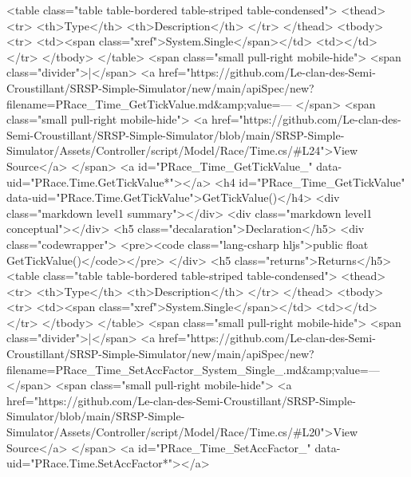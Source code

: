  <table class="table table-bordered table-striped table-condensed">
    <thead>
      <tr>
        <th>Type</th>
        <th>Description</th>
      </tr>
    </thead>
    <tbody>
      <tr>
        <td><span class="xref">System.Single</span></td>
        <td></td>
      </tr>
    </tbody>
  </table>
  <span class="small pull-right mobile-hide">
    <span class="divider">|</span>
    <a href="https://github.com/Le-clan-des-Semi-Croustillant/SRSP-Simple-Simulator/new/main/apiSpec/new?filename=PRace_Time_GetTickValue.md&amp;value=---%
  </span>
  <span class="small pull-right mobile-hide">
    <a href="https://github.com/Le-clan-des-Semi-Croustillant/SRSP-Simple-Simulator/blob/main/SRSP-Simple-Simulator/Assets/Controller/script/Model/Race/Time.cs/#L24">View Source</a>
  </span>
  <a id="PRace_Time_GetTickValue_" data-uid="PRace.Time.GetTickValue*"></a>
  <h4 id="PRace_Time_GetTickValue" data-uid="PRace.Time.GetTickValue">GetTickValue()</h4>
  <div class="markdown level1 summary"></div>
  <div class="markdown level1 conceptual"></div>
  <h5 class="decalaration">Declaration</h5>
  <div class="codewrapper">
    <pre><code class="lang-csharp hljs">public float GetTickValue()</code></pre>
  </div>
  <h5 class="returns">Returns</h5>
  <table class="table table-bordered table-striped table-condensed">
    <thead>
      <tr>
        <th>Type</th>
        <th>Description</th>
      </tr>
    </thead>
    <tbody>
      <tr>
        <td><span class="xref">System.Single</span></td>
        <td></td>
      </tr>
    </tbody>
  </table>
  <span class="small pull-right mobile-hide">
    <span class="divider">|</span>
    <a href="https://github.com/Le-clan-des-Semi-Croustillant/SRSP-Simple-Simulator/new/main/apiSpec/new?filename=PRace_Time_SetAccFactor_System_Single_.md&amp;value=---%
  </span>
  <span class="small pull-right mobile-hide">
    <a href="https://github.com/Le-clan-des-Semi-Croustillant/SRSP-Simple-Simulator/blob/main/SRSP-Simple-Simulator/Assets/Controller/script/Model/Race/Time.cs/#L20">View Source</a>
  </span>
  <a id="PRace_Time_SetAccFactor_" data-uid="PRace.Time.SetAccFactor*"></a>
